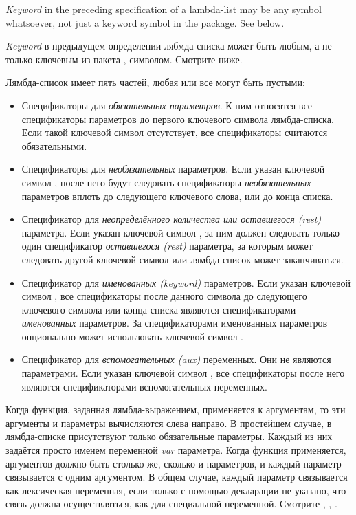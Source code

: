 \emph{Keyword} in the preceding specification of a lambda-list
may be any symbol whatsoever, not just a keyword symbol
in the  package.  See below.

\emph{Keyword} в предыдущем определении лябмда-списка может быть любым, а не
только ключевым из пакета , символом. Смотрите ниже.

Лямбда-список имеет пять частей, любая или все могут быть пустыми:

\begin{itemize}
\item
Спецификаторы для \emph{обязательных параметров}. К ним относятся все
спецификаторы параметров до первого ключевого символа лямбда-списка. Если такой
ключевой символ отсутствует, все спецификаторы считаются обязательными.

\item
Спецификаторы для \emph{необязательных} параметров.
Если указан ключевой символ , после него будут следовать спецификаторы
\emph{необязательных} параметров вплоть до следующего ключевого слова, или до
конца списка.

\item
Спецификатор для \emph{неопределённого количества или оставшегося (rest)}
параметра. Если указан ключевой символ , за ним должен следовать
только один спецификатор \emph{оставшегося (rest)} параметра, за которым может
следовать другой ключевой символ или лямбда-список может заканчиваться.

\item
Спецификатор для \emph{именованных (keyword)} параметров. Если указан ключевой
символ , все спецификаторы после данного символа до
следующего ключевого символа или конца списка являются спецификаторами
\emph{именованных} параметров. За спецификаторами именованных параметров
опционально может использовать ключевой символ
.

\item
Спецификатор для \emph{вспомогательных (aux)} переменных. Они не являются
параметрами. Если указан ключевой символ , все
спецификаторы после него являются спецификаторами вспомогательных переменных.
\end{itemize}

Когда функция, заданная лямбда-выражением, применяется к аргументам, то эти
аргументы и параметры вычисляются слева направо.
В простейшем случае, в лямбда-списке присутствуют только обязательные
параметры. Каждый из них задаётся просто именем переменной \emph{var}
параметра.
Когда функция применяется, аргументов должно быть столько же, сколько и
параметров, и каждый параметр связывается с одним аргументом. В общем случае,
каждый параметр связывается как лексическая переменная, если только с помощью
декларации не указано, что связь должна осуществляться, как для специальной
переменной. Смотрите , , .

